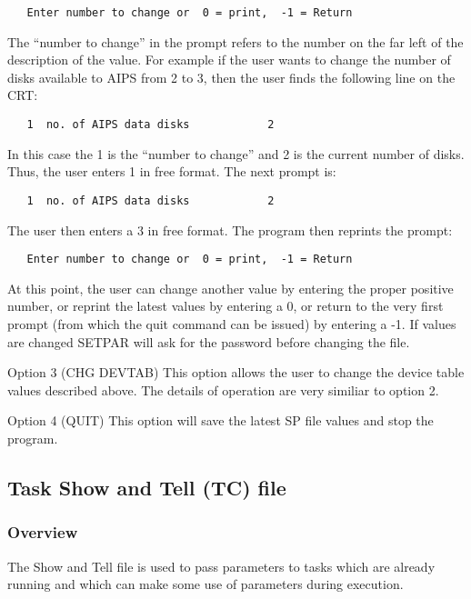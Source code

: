 \begin{verbatim}
   Enter number to change or  0 = print,  -1 = Return
\end{verbatim}

The ``number to change'' in the prompt refers to the number on the far
left of the description of the value.  For example if the user wants
to change the number of disks available to AIPS from 2 to 3, then
the user finds the following line on the CRT:

\begin{verbatim}
   1  no. of AIPS data disks            2
\end{verbatim}

In this case the 1 is the ``number to change'' and 2 is the current
number of disks.  Thus, the user enters 1 in free format.
The next prompt is:

\begin{verbatim}
   1  no. of AIPS data disks            2
\end{verbatim}

The user then enters a 3 in free format.  The program then
reprints the prompt:

\begin{verbatim}
   Enter number to change or  0 = print,  -1 = Return
\end{verbatim}

At this point, the user can change another value by entering the
proper positive number, or reprint the latest values by entering a
0, or return to the very first prompt (from which the quit command
can be issued) by entering a -1.  If values are changed SETPAR will
ask for the password before changing the file.

Option 3 (CHG DEVTAB)
   This option allows the user to change the device table values
described above.  The details of operation are very similiar to option
2.

Option 4 (QUIT)
   This option will save the latest SP file values and stop the program.

\subsection{Task Show and Tell (TC) file}
\subsubsection{Overview}

 The Show and Tell file is used to pass parameters to tasks
which are already running and which can make some use of parameters
during execution.

